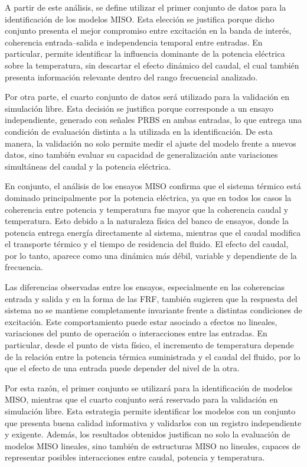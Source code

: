\documentclass[11pt]{report}
\begin{document}
A partir de este análisis, se define utilizar el primer conjunto de datos para la identificación de los modelos MISO. Esta elección se justifica porque dicho conjunto presenta el mejor compromiso entre excitación en la banda de interés, coherencia entrada–salida e independencia temporal entre entradas. En particular, permite identificar la influencia dominante de la potencia eléctrica sobre la temperatura, sin descartar el efecto dinámico del caudal, el cual también presenta información relevante dentro del rango frecuencial analizado.

Por otra parte, el cuarto conjunto de datos será utilizado para la validación en simulación libre. Esta decisión se justifica porque corresponde a un ensayo independiente, generado con señales PRBS en ambas entradas, lo que entrega una condición de evaluación distinta a la utilizada en la identificación. De esta manera, la validación no solo permite medir el ajuste del modelo frente a nuevos datos, sino también evaluar su capacidad de generalización ante variaciones simultáneas del caudal y la potencia eléctrica.

En conjunto, el análisis de los ensayos MISO confirma que el sistema térmico está dominado principalmente por la potencia eléctrica, ya que en todos los casos la coherencia entre potencia y temperatura fue mayor que la coherencia caudal y temperatura. Esto debido a la naturaleza física del banco de ensayos, donde la potencia entrega energía directamente al sistema, mientras que el caudal modifica el transporte térmico y el tiempo de residencia del fluido. El efecto del caudal, por lo tanto, aparece como una dinámica más débil, variable y dependiente de la frecuencia.

Las diferencias observadas entre los ensayos, especialmente en las coherencias entrada y salida y en la forma de las FRF, también sugieren que la respuesta del sistema no se mantiene completamente invariante frente a distintas condiciones de excitación. Este comportamiento puede estar asociado a efectos no lineales, variaciones del punto de operación o interacciones entre las entradas. En particular, desde el punto de vista físico, el incremento de temperatura depende de la relación entre la potencia térmica suministrada y el caudal del fluido, por lo que el efecto de una entrada puede depender del nivel de la otra.

Por esta razón, el primer conjunto se utilizará para la identificación de modelos MISO, mientras que el cuarto conjunto será reservado para la validación en simulación libre. Esta estrategia permite identificar los modelos con un conjunto que presenta buena calidad informativa y validarlos con un registro independiente y exigente. Además, los resultados obtenidos justifican no solo la evaluación de modelos MISO lineales, sino también de estructuras MISO no lineales, capaces de representar posibles interacciones entre caudal, potencia y temperatura.
\end{document}
